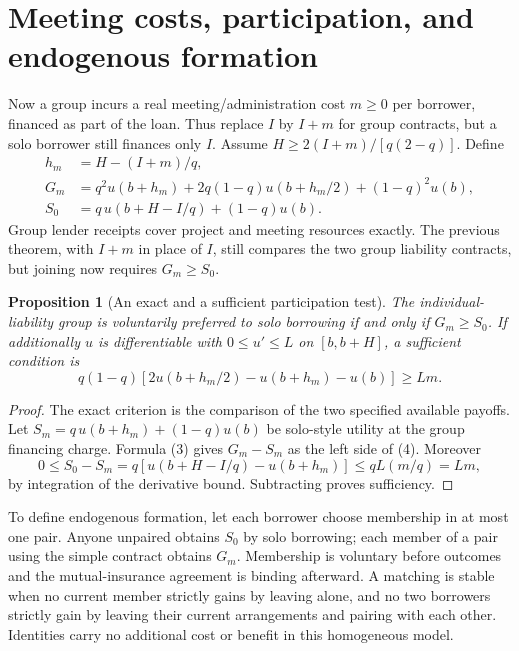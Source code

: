 \documentclass[11pt]{article}
\newtheorem{proposition}[theorem]{Proposition}
\theoremstyle{remark}
\begin{document}
\section{Meeting costs, participation, and endogenous formation}
Now a group incurs a real meeting/administration cost $m\geq0$ per borrower,
financed as part of the loan. Thus replace $I$ by $I+m$ for group contracts,
but a solo borrower still finances only $I$. Assume
$H\geq2(I+m)/[q(2-q)]$. Define
\begin{align*}
 h_m&=H-(I+m)/q,\\
 G_m&=q^2u(b+h_m)+2q(1-q)u(b+h_m/2)+(1-q)^2u(b),\\
 S_0&=q\,u(b+H-I/q)+(1-q)u(b).
\end{align*}
Group lender receipts cover project and meeting resources exactly.
The previous theorem, with $I+m$ in place of $I$, still compares the two
group liability contracts, but joining now requires $G_m\geq S_0$.

\begin{proposition}[An exact and a sufficient participation test]
The individual-liability group is voluntarily preferred to solo borrowing
if and only if $G_m\geq S_0$. If additionally $u$ is differentiable with
$0\leq u'\leq L$ on $[b,b+H]$, a sufficient condition is
\[
 q(1-q)[2u(b+h_m/2)-u(b+h_m)-u(b)]\geq Lm. \tag{4}
\]
\end{proposition}
\begin{proof}
The exact criterion is the comparison of the two specified available
payoffs. Let $S_m=q\,u(b+h_m)+(1-q)u(b)$ be solo-style utility at
the group financing charge. Formula (3) gives $G_m-S_m$ as the left
side of (4). Moreover
\[
 0\leq S_0-S_m
 =q[u(b+H-I/q)-u(b+h_m)]\leq qL(m/q)=Lm,
\]
by integration of the derivative bound. Subtracting proves sufficiency.
\end{proof}

To define endogenous formation, let each borrower choose membership in at
most one pair. Anyone unpaired obtains $S_0$ by solo borrowing; each member
of a pair using the simple contract obtains $G_m$. Membership is voluntary
before outcomes and the mutual-insurance agreement is binding afterward.
A matching is stable when no current member strictly gains by leaving
alone, and no two borrowers strictly gain by leaving their current
arrangements and pairing with each other. Identities carry no additional
cost or benefit in this homogeneous model.
\end{document}
